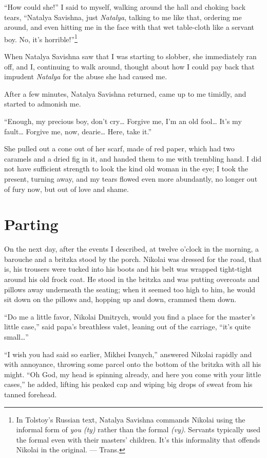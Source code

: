 ``How could she!'' I said to myself, walking around the hall and choking back tears, ``Natalya Savishna, just \emph{Natalya}, talking to me like that, ordering me around, and even hitting me in the face with that wet table-cloth like a servant boy. No, it's horrible!''\footnote{In Tolstoy's Russian text, Natalya Savishna commands Nikolai using the informal form of \textit{you} \textit{(ty)} rather than the formal \textit{(vy)}. Servants typically used the formal even with their masters' children. It's this informality that offends Nikolai in the original. --- Trans.}

When Natalya Savishna saw that I was starting to slobber, she immediately ran off, and I, continuing to walk around, thought about how I could pay back that impudent \emph{Natalya} for the abuse she had caused me.

After a few minutes, Natalya Savishna returned, came up to me timidly, and started to admonish me.

``Enough, my precious boy, don't cry\ldots{} Forgive me, I'm an old fool\ldots{} It's my fault\ldots{} Forgive me, now, dearie\ldots{} Here, take it.'' %

She pulled out a cone out of her scarf, made of red paper, which had two caramels and a dried fig in it, and handed them to me with trembling hand. I did not have sufficient strength to look the kind old woman in the eye; I took the present, turning away, and my tears flowed even more abundantly, no longer out of fury now, but out of love and shame.

\chapter{Parting} %

On the next day, after the events I described, at twelve o'clock in the morning, a barouche and a britzka stood by the porch. Nikolai was dressed for the road, that is, his trousers were tucked into his boots and his belt was wrapped tight-tight around his old frock coat. He stood in the britzka and was putting overcoats and pillows away underneath the seating; when it seemed too high to him, he would sit down on the pillows and, hopping up and down, crammed them down.

``Do me a little favor, Nikolai Dmitrych, would you find a place for the master's little case,'' said papa's breathless valet, leaning out of the carriage, ``it's quite small\ldots{}'' %

``I wish you had said so earlier, Mikhei Ivanych,'' answered Nikolai rapidly and with annoyance, throwing some parcel onto the bottom of the britzka with all his might. ``Oh God, my head is spinning already, and here you come with your little cases,'' he added, lifting his peaked cap and wiping big drops of sweat from his tanned forehead. %

